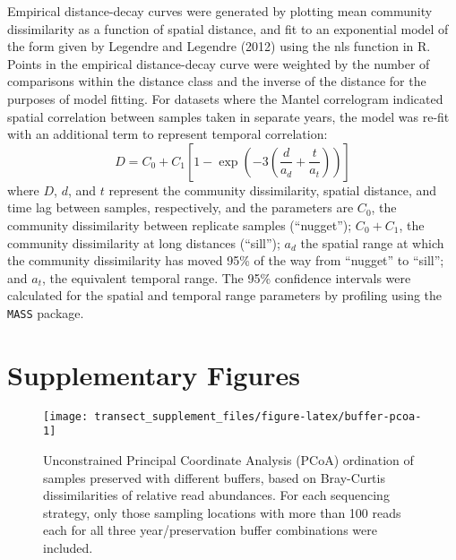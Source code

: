 \documentclass[
]{article}
\begin{document}
Empirical distance-decay curves were generated by plotting mean community dissimilarity as a function of spatial distance, and fit to an exponential model of the form given by Legendre and Legendre (2012) using the nls function in R.
Points in the empirical distance-decay curve were weighted by the number of comparisons within the distance class and the inverse of the distance for the purposes of model fitting.
For datasets where the Mantel correlogram indicated spatial correlation between samples taken in separate years, the model was re-fit with an additional term to represent temporal correlation:
\[D = C_0 + C_1\left[1 - \exp\left(-3  \left(\frac{d}{a_d} + \frac{t}{a_t}\right)\right)\right]\]
where \(D\), \(d\), and \(t\) represent the community dissimilarity, spatial distance, and time lag between samples, respectively, and the parameters are \(C_0\), the community dissimilarity between replicate samples (``nugget''); \(C_0 + C_1\), the community dissimilarity at long distances (``sill''); \(a_d\) the spatial range at which the community dissimilarity has moved 95\% of the way from ``nugget'' to ``sill''; and \(a_t\), the equivalent temporal range.
The 95\% confidence intervals were calculated for the spatial and temporal range parameters by profiling using the \texttt{MASS} package.

\newpage

\hypertarget{supplementary-figures}{%
\section{Supplementary Figures}\label{supplementary-figures}}

\listoffigures






\begin{figure}

{\centering \texttt{[image: transect\_supplement\_files/figure-latex/buffer-pcoa-1]} 

}

\caption[Unconstrained Principal Coordinate Analysis (PCoA) ordination of samples preserved with different buffers]{Unconstrained Principal Coordinate Analysis (PCoA) ordination of samples preserved with different buffers, based on Bray-Curtis dissimilarities of relative read abundances.
For each sequencing strategy, only those sampling locations with more than 100 reads each for all three year/preservation buffer combinations were included.}\label{fig:buffer-pcoa}
\end{figure}
\end{document}

